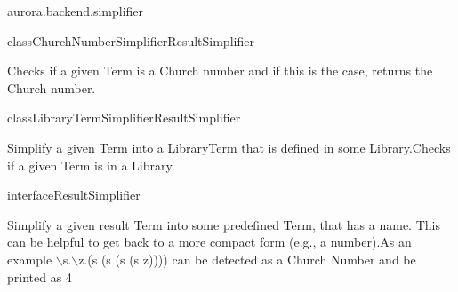 \begin{texdocpackage}{aurora.backend.simplifier}
\label{texdoclet:aurora.backend.simplifier}

\begin{texdocclass}{class}{ChurchNumberSimplifier}{}{ResultSimplifier}
\label{texdoclet:aurora.backend.simplifier.ChurchNumberSimplifier}
\begin{texdocclassintro}
Checks if a given Term is a Church number and if this is the case, returns the Church number.\end{texdocclassintro}
\begin{texdocclassconstructors}
\end{texdocclassconstructors}
\begin{texdocclassmethods}
\end{texdocclassmethods}
\end{texdocclass}


\begin{texdocclass}{class}{LibraryTermSimplifier}{}{ResultSimplifier}
\label{texdoclet:aurora.backend.simplifier.LibraryTermSimplifier}
\begin{texdocclassintro}
Simplify a given Term into a LibraryTerm that is defined in some Library.\texdocbr  Checks if a given Term is in a Library.\end{texdocclassintro}
\begin{texdocclassconstructors}
\end{texdocclassconstructors}
\begin{texdocclassmethods}
\end{texdocclassmethods}
\end{texdocclass}


\begin{texdocclass}{interface}{ResultSimplifier}{}{}
\label{texdoclet:aurora.backend.simplifier.ResultSimplifier}
\begin{texdocclassintro}
Simplify a given result Term into some predefined Term, that has a name.
 This can be helpful to get back to a more compact form (e.g., a number).\texdocbr  As an example $\backslash$s.$\backslash$z.(s (s (s (s z)))) can be detected as a Church Number and be printed as 4\end{texdocclassintro}
\begin{texdocclassmethods}
\end{texdocclassmethods}
\end{texdocclass}



\end{texdocpackage}
